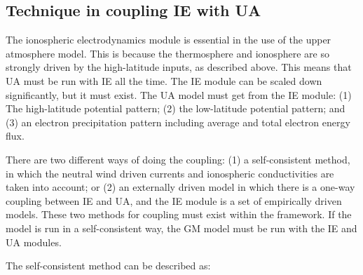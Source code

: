 \subsection{Technique in coupling IE with UA}

The ionospheric electrodynamics module is essential in the use of the
upper atmosphere model.  This is because the thermosphere and
ionosphere are so strongly driven by the high-latitude inputs, as
described above.  This means that UA must be run with IE all the time.
The IE module can be scaled down significantly, but it must exist.
The UA model must get from the IE module: (1) The high-latitude
potential pattern; (2) the low-latitude potential pattern; and (3) an
electron precipitation pattern including average and total electron
energy flux.

There are two different ways of doing the coupling: (1) a
self-consistent method, in which the neutral wind driven currents and
ionospheric conductivities are taken into account; or (2) an
externally driven model in which there is a one-way coupling between
IE and UA, and the IE module is a set of empirically driven models.
These two methods for coupling must exist within the framework.  If
the model is run in a self-consistent way, the GM model must be
run with the IE and UA modules.

The self-consistent method can be described as:


